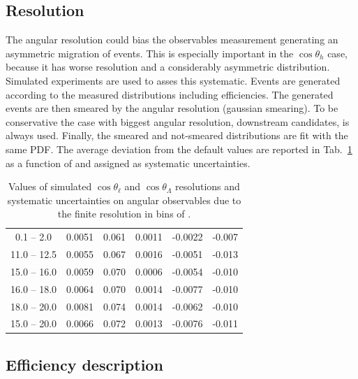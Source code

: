 \subsection{Resolution}

The angular resolution could bias the observables measurement 
generating an asymmetric migration of events.
This is especially important in the $\cos \theta_h$ case, because it has worse resolution
and a considerably asymmetric distribution. Simulated experiments are used to asses this systematic.
Events are generated according to the measured distributions including efficiencies.
The generated events are then smeared by the angular resolution (gaussian smearing).
To be conservative the case with biggest angular resolution, downstream candidates, is always used.
Finally, the smeared and not-smeared distributions are fit with the same PDF.  
The average deviation from the default values are reported in Tab.~\ref{tab:resolSys}
as a function of \qsq and assigned as systematic uncertainties.
%
\begin{table}[h]
\centering
\caption{Values of simulated $\cos\theta_\ell$ and $\cos\theta_\Lambda$ 
resolutions and systematic uncertainties on angular observables due to
the finite resolution in bins of \qsq.}
\begin{tabular}{c|ccccc}
 \boldmath{ \qsq [\gevgevcccc] } &  \boldmath{ $\sigma_\ell$ }    &  \boldmath{ $\sigma_\Lambda$}   & \boldmath{ $\Delta \afbl$} &  \boldmath{ $\Delta \fl$} & \boldmath{ $\Delta \afbh$ } \\ \hline
\phantom{x}0.1 -- 2.0\phantom{x}  & 0.0051 & 0.061 & 0.0011 & -0.0022 & -0.007 \\ 
11.0 -- 12.5 & 0.0055 & 0.067 & 0.0016 & -0.0051 & -0.013 \\
15.0 -- 16.0 & 0.0059 & 0.070 & 0.0006 & -0.0054 & -0.010 \\
16.0 -- 18.0 & 0.0064 & 0.070 & 0.0014 & -0.0077 & -0.010 \\
18.0 -- 20.0 & 0.0081 & 0.074 & 0.0014 & -0.0062 & -0.010 \\
\hline
15.0 -- 20.0 & 0.0066 & 0.072 & 0.0013 & -0.0076 & -0.011 \\
\end{tabular}
\label{tab:resolSys}
\end{table}


\subsection{Efficiency description}

